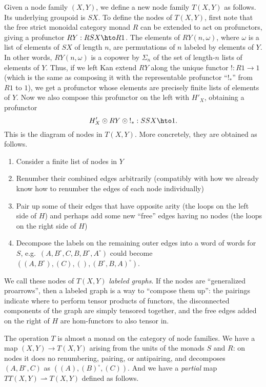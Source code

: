 \documentclass{amsart}
\newcommand{\uniq}{\mathord{!}}
\renewcommand{\o}{^{\circ}}
\begin{document}
Given a node family $(X,Y)$, we define a new node family $T(X,Y)$ as follows.
Its underlying groupoid is $S X$.
To define the nodes of $T(X,Y)$, first note that the free strict monoidal category monad $R$ can be extended to act on profunctors, giving a profunctor $RY : RSX \hto R1$.
The elements of $RY(n,\omega)$, where $\omega$ is a list of elements of $SX$ of length $n$, are permutations of $n$ labeled by elements of $Y$.
In other words, $RY(n,\omega)$ is a copower by $\Sigma_n$ of the set of length-$n$ lists of elements of $Y$.
Thus, if we left Kan extend $RY$ along the unique functor $\uniq:R1\to 1$ (which is the same as composing it with the representable profunctor ``$\uniq_*$'' from $R1$ to $1$), we get a profunctor whose elements are precisely finite lists of elements of $Y$.
Now we also compose this profunctor on the left with $H'_X$, obtaining a profunctor
\[ H'_X \odot RY \odot \uniq_* : SSX \hto 1.\]
This is the diagram of nodes in $T(X,Y)$.
More concretely, they are obtained as follows.
\begin{enumerate}
\item Consider a finite list of nodes in $Y$
\item Renumber their combined edges arbitrarily (compatibly with how we already know how to renumber the edges of each node individually)
\item Pair up some of their edges that have opposite arity (the loops on the left side of $H$) and perhaps add some new ``free'' edges having no nodes (the loops on the right side of $H$)
\item Decompose the labels on the remaining outer edges into a word of words for $S$, e.g.\ $(A,B\o,C,B,B\o,A\o)$ could become $((A,B\o),(C),(),(B\o,B,A)\o)$.
\end{enumerate}
We call these nodes of $T(X,Y)$ \emph{labeled graphs}.
If the nodes are ``generalized proarrows'', then a labeled graph is a way to ``compose them up'': the pairings indicate where to perform tensor products of functors, the disconnected components of the graph are simply tensored together, and the free edges added on the right of $H$ are hom-functors to also tensor in.

The operation $T$ is almost a monad on the category of node families.
We have a map $(X,Y) \to T(X,Y)$ arising from the units of the monads $S$ and $R$: on nodes it does no renumbering, pairing, or antipairing, and decomposes $(A,B\o,C)$ as $((A),(B)\o,(C))$.
And we have a \emph{partial} map $TT(X,Y)\rightharpoonup T(X,Y)$ defined as follows.
\end{document}

